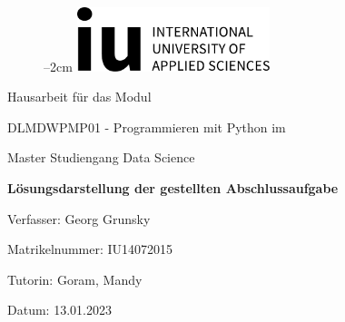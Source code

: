 
\label{titlePage}
\begin{figure}[h]
\centering
\advance\leftskip--2cm
\includegraphics[width=0.50\textwidth]{pics/logo.pdf}
\end{figure}
\FloatBarrier

\begin{Large} 
\begin{center}
Hausarbeit für das Modul
\end{center}
\end{Large} 

\vspace*{5mm}

\begin{large} 
\begin{center}
DLMDWPMP01 - Programmieren mit Python im
\end{center}
\end{large} 

\begin{large} 
\begin{center}
Master Studiengang Data Science
\end{center}
\end{large}

\vspace*{15mm}

\begin{Large} 
\begin{center}
\textbf{Lösungsdarstellung der gestellten Abschlussaufgabe}
\end{center}
\end{Large}

\vspace*{15mm}

\begin{large} 
\begin{center}
Verfasser: Georg Grunsky
\end{center}
\end{large} 

\vspace*{-6mm}

\begin{large} 
\begin{center}
Matrikelnummer: IU14072015
\end{center}
\end{large} 

\vspace*{-6mm}

\begin{large} 
\begin{center}
Tutorin: Goram, Mandy
\end{center}
\end{large} 

\vspace*{-6mm}

\begin{large} 
\begin{center}
Datum: 13.01.2023
\end{center}
\end{large} 


\pagestyle{empty} %

